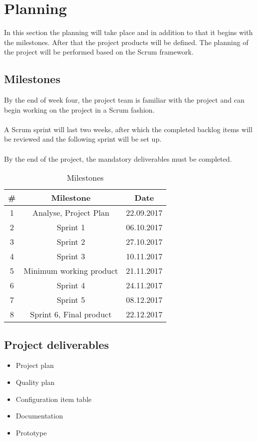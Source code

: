 \section{Planning}
In this section the planning will take place and in addition to that it begins with the milestones.
After that the project products will be defined. The planning of the project will be performed based on the Scrum framework.

    \subsection{Milestones}
    By the end of week four, the project team is familiar with the project and can begin working on the project in a Scrum fashion.\\\\
    A Scrum sprint will last two weeks, after which the completed backlog items will be reviewed and the following sprint will be set up.\\\\
    By the end of the project, the mandatory deliverables must be completed.

    \begin{table}[H]
        \centering
        \begin{tabular}{|c|c|c|}
            \textbf{\#} & \textbf{Milestone}        & \textbf{Date} \\ \hline \hline
            1           & Analyse, Project Plan     & 22.09.2017 \\ \hline
            2           & Sprint 1                  & 06.10.2017 \\ \hline
            3           & Sprint 2                  & 27.10.2017 \\ \hline
            4           & Sprint 3                  & 10.11.2017 \\ \hline
            5           & Minimum working product   & 21.11.2017 \\ \hline
            6           & Sprint 4                  & 24.11.2017 \\ \hline
            7           & Sprint 5                  & 08.12.2017 \\ \hline
            8           & Sprint 6, Final product   & 22.12.2017 
        \end{tabular}
        \caption{Milestones}   
    \end{table}
    
    \subsection{Project deliverables}\label{sec:deliverables}
    \begin{itemize}
        \item Project plan
        \item Quality plan
        \item Configuration item table
        \item Documentation
        \item Prototype
    \end{itemize}